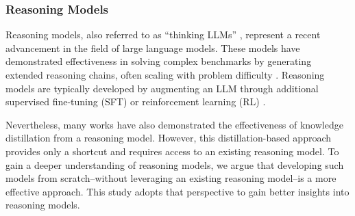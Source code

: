 \subsubsection{Reasoning Models}

Reasoning models, also referred to as ``thinking LLMs'' \citep{wu2024thinkingllmsgeneralinstruction}, represent a recent advancement in the field of large language models. These models have demonstrated effectiveness in solving complex benchmarks by generating extended reasoning chains, often scaling with problem difficulty \citep{deepseekai2025deepseekr1incentivizingreasoningcapability}. Reasoning models are typically developed by augmenting an LLM through additional supervised fine-tuning (SFT) \citep{muennighoff2025s1simpletesttimescaling} or reinforcement learning (RL) \citep{deepseekai2025deepseekr1incentivizingreasoningcapability}.

Nevertheless, many works \citep{skyt12025,bespokestratos,huang2024o1replicationjourney} have also demonstrated the effectiveness of knowledge distillation from a reasoning model. However, this distillation-based approach provides only a shortcut and requires access to an existing reasoning model. To gain a deeper understanding of reasoning models, we argue that developing such models from scratch--without leveraging an existing reasoning model--is a more effective approach. This study adopts that perspective to gain better insights into reasoning models.